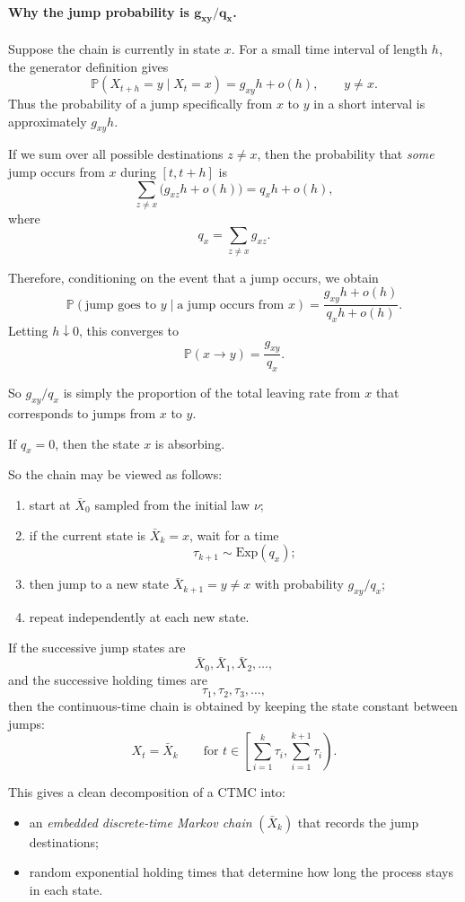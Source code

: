 \documentclass[11pt]{article}
\theoremstyle{definition}
\begin{document}
\paragraph{Why the jump probability is \(\boldsymbol{g_{xy}/q_x}\).}
Suppose the chain is currently in state \(x\). For a small time interval of length \(h\), the generator definition gives
\[
\mathbb P(X_{t+h}=y\mid X_t=x)=g_{xy}h+o(h), \qquad y\neq x.
\]
Thus the probability of a jump specifically from \(x\) to \(y\) in a short interval is approximately \(g_{xy}h\).

If we sum over all possible destinations \(z\neq x\), then the probability that \emph{some} jump occurs from \(x\) during \([t,t+h]\) is
\[
\sum_{z\neq x}\bigl(g_{xz}h+o(h)\bigr)
=
q_x h+o(h),
\]
where
\[
q_x=\sum_{z\neq x}g_{xz}.
\]

Therefore, conditioning on the event that a jump occurs, we obtain
\[
\mathbb P(\text{jump goes to }y \mid \text{a jump occurs from }x)
=
\frac{g_{xy}h+o(h)}{q_x h+o(h)}.
\]
Letting \(h\downarrow 0\), this converges to
\[
\mathbb P(x\to y)=\frac{g_{xy}}{q_x}.
\]

So \(g_{xy}/q_x\) is simply the proportion of the total leaving rate from \(x\) that corresponds to jumps from \(x\) to \(y\).

If $q_x=0$, then the state $x$ is absorbing.

So the chain may be viewed as follows:
\begin{enumerate}[leftmargin=2em]
    \item start at $\bar X_0$ sampled from the initial law $\nu$;
    \item if the current state is $\bar X_k=x$, wait for a time
    \[
    \tau_{k+1}\sim \mathrm{Exp}(q_x);
    \]
    \item then jump to a new state $\bar X_{k+1}=y\ne x$ with probability $g_{xy}/q_x$;
    \item repeat independently at each new state.
\end{enumerate}

If the successive jump states are
\[
\bar X_0,\bar X_1,\bar X_2,\dots,
\]
and the successive holding times are
\[
\tau_1,\tau_2,\tau_3,\dots,
\]
then the continuous-time chain is obtained by keeping the state constant between jumps:
\[
X_t=\bar X_k
\qquad
\text{for }t\in\left[\sum_{i=1}^k \tau_i,\sum_{i=1}^{k+1}\tau_i\right).
\]

This gives a clean decomposition of a CTMC into:
\begin{itemize}[leftmargin=2em]
    \item an \emph{embedded discrete-time Markov chain} $(\bar X_k)$ that records the jump destinations;
    \item random exponential holding times that determine how long the process stays in each state.
\end{itemize}
\end{document}
